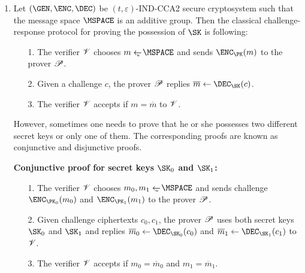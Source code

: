 \documentclass{article}
\begin{document}
\begin{enumerate}
\item Let $(\GEN,\ENC,\DEC)$ be $(t,\varepsilon)$-IND-CCA2 secure
  cryptosystem such that the message space $\MSPACE$ is an additive
  group. Then the classical challenge-response protocol for proving
  the possession of  $\SK$ is following:
  \begin{enumerate}
  \item[1.] The verifier $\mathscr{V}$ chooses $m\getsu\MSPACE$ and sends
    $\ENC_\PK(m)$ to the prover $\mathscr{P}$.
  \item[2.] Given a challenge $c$, the prover $\mathscr{P}$ replies
    $\overline{m}\gets\DEC_\SK(c)$.
  \item[3.] The verifier $\mathscr{V}$ accepts if $m=\overline{m}$ to
    $\mathscr{V}$.
  \end{enumerate}
  However, sometimes one needs to prove that he or she possesses two
  different secret keys or only one of them. The corresponding proofs
  are known as conjunctive and disjunctive proofs.

  \textbf{Conjunctive proof for secret keys $\SK_0$ and $\SK_1$:}
  \begin{enumerate}
  \item[1.] The verifier $\mathscr{V}$ chooses $m_0,m_1\getsu\MSPACE$
    and sends challenge $\ENC_{\PK_0}(m_0)$ and $\ENC_{\PK_1}(m_1)$ to
    the prover $\mathscr{P}$.
  \item[2.] Given challenge ciphertexts $c_0,c_1$, the prover $\mathscr{P}$
    uses both secret keys $\SK_0$ and $\SK_1$ and replies
    $\overline{m}_0\gets\DEC_{\SK_0}(c_0)$ and
    $\overline{m}_1\gets\DEC_{\SK_1}(c_1)$ to $\mathscr{V}$.
  \item[3.] The verifier $\mathscr{V}$ accepts if $m_0=\overline{m}_0$
    and $m_1=\overline{m}_1$.
  \end{enumerate}


\end{enumerate}
\end{document}
